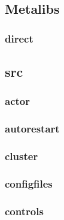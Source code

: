 \documentclass[a4paper]{article}
\begin{document}
\clearpage\subsection[Metalibs]{Metalibs}
\hypertarget{RefHeading17531167907073}{}\subsubsection[direct]{direct}
\hypertarget{RefHeading17551167907073}{}\clearpage\subsection[src]{src}
\hypertarget{RefHeading17571167907073}{}\clearpage\subsubsection[actor]{actor}
\hypertarget{RefHeading17591167907073}{}\subsubsection{}
\clearpage\subsubsection[autorestart]{autorestart}
\hypertarget{RefHeading17611167907073}{}\subsubsection{}
\clearpage\subsubsection[cluster]{cluster}
\hypertarget{RefHeading17631167907073}{}\subsubsection{}
\clearpage\subsubsection[configfiles]{configfiles}
\hypertarget{RefHeading17651167907073}{}\subsubsection{}
\clearpage\subsubsection[controls]{controls}
\end{document}

